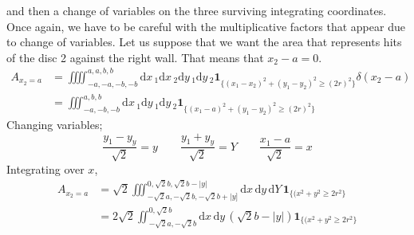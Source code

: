 \documentclass[superscriptaddress,pre,reprint,showpacs,onecolumn]{revtex4-1}
\newcommand{\rd}[1]{\mathrm{d}{#1} \,}
\newcommand{\indicator}[1]{\mathbf{1}_{ \{   #1 \} } }
\begin{document}
    and then a change
    of variables on the three surviving integrating coordinates. Once again, we
    have to be careful with the multiplicative factors that appear due to change
    of variables. Let us suppose that we want the area that represents hits of
    the disc 2 against the right wall. That means that $x_2-a=0$. 
    \begin{align}
      A_{x_2=a} & =\iiiint_{-a,-a,-b,-b}^{a,a,b,b} \rd x_1 \rd x_2 \rd y_1 \rd y_2 
      \indicator{(x_1-x_2)^2+(y_1-y_2)^2 \geq (2 r)^2} \delta (x_2-a)\\
      &=\iiint_{-a,-b,-b}^{a,b,b} \rd x_1  \rd y_1 \rd y_2 
      \indicator{(x_1-a)^2+(y_1-y_2)^2 \geq (2 r)^2} 
    \end{align}
    Changing variables;
    \begin{equation}
      \frac{y_1-y_y}{\sqrt{2}} =  y  \qquad \frac{y_1+y_y}{\sqrt{2}}=Y \qquad \frac{x_1-a}{\sqrt{2}}=x
    \end{equation}
    Integrating over $x$,
    \begin{align}\label{areachoquexy}
      A_{x_2=a} & =\sqrt{2}\iiint_{-\sqrt{2}a,-\sqrt{2}b,-\sqrt{2}b+|y]}^{0,\sqrt{2}b,\sqrt{2}b-|y|}
        \rd x \rd y \rd Y 
      \indicator{(x^2+y^2 \geq 2 r^2} \\
      &=2\sqrt{2}\iint_{-\sqrt{2}a,-\sqrt{2}b}^{0,\sqrt{2}b}
        \rd x \rd y (\sqrt{2} b - |y|)
      \indicator{(x^2+y^2 \geq 2 r^2}
    \end{align}
    
\end{document}

